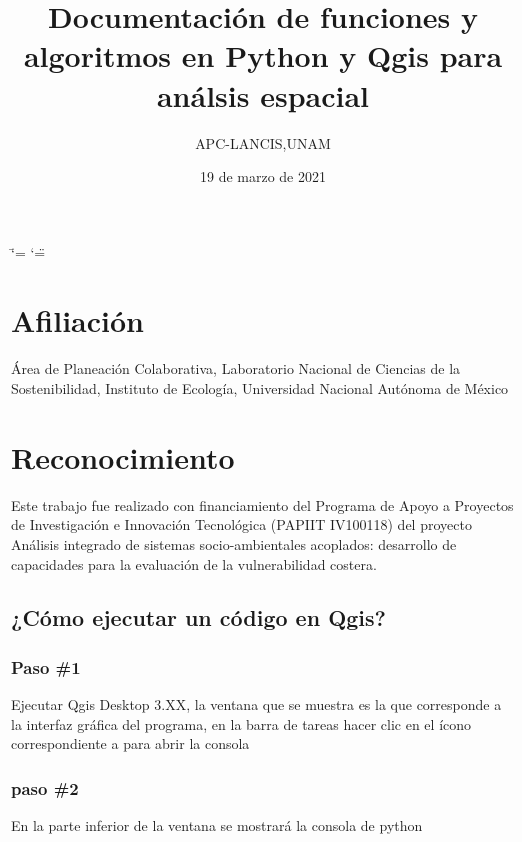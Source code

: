\documentclass[letterpaper,10pt,spanish]{sphinxmanual}
\title{Documentación de funciones y algoritmos en Python y Qgis para análsis espacial}
\date{19 de marzo de 2021}
\author{APC-LANCIS,UNAM}
\begin{document}
\ifdefined\shorthandoff
  \ifnum\catcode`\=\string=\active\shorthandoff{=}\fi
  \ifnum\catcode`\"=\active{}\fi
\fi

\pagestyle{empty}
\sphinxmaketitle
\pagestyle{plain}
\sphinxtableofcontents
\pagestyle{normal}
\label{\detokenize{index::doc}}



\chapter{Afiliación}
\label{\detokenize{index:afiliacion}}
Área de Planeación Colaborativa, Laboratorio Nacional de Ciencias de la Sostenibilidad, Instituto de Ecología, Universidad Nacional Autónoma de México


\chapter{Reconocimiento}
\label{\detokenize{index:reconocimiento}}
Este trabajo fue realizado con financiamiento del Programa de Apoyo a Proyectos de Investigación e Innovación Tecnológica (PAPIIT IV100118)
del proyecto Análisis integrado de sistemas socio-ambientales acoplados: desarrollo de capacidades para la evaluación de la vulnerabilidad costera.


\section{¿Cómo ejecutar un código en Qgis?}
\label{\detokenize{ejecucion:como-ejecutar-un-codigo-en-qgis}}\label{\detokenize{ejecucion::doc}}

\subsection{Paso \#1}
\label{\detokenize{ejecucion:paso-1}}
Ejecutar Qgis Desktop 3.XX, la ventana que se muestra es la que
corresponde a la interfaz gráfica del programa, en la barra de tareas
hacer clic en el ícono correspondiente a  para abrir la consola

\noindent{}


\subsection{paso \#2}
\label{\detokenize{ejecucion:paso-2}}
En la parte inferior de la ventana se mostrará la consola de python
\end{document}

